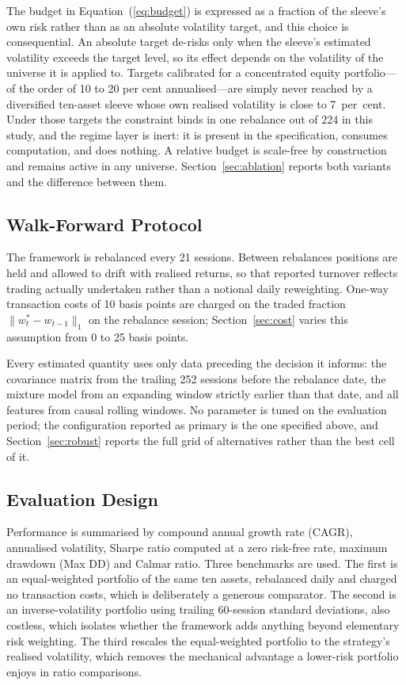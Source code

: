 \documentclass{singlecol-new}
\theoremstyle{TH}{
\newtheorem{lemma}{Lemma}
\newtheorem{theorem}[lemma]{Theorem}
\newtheorem{corrolary}[lemma]{Corrolary}
\newtheorem{conjecture}[lemma]{Conjecture}
\newtheorem{proposition}[lemma]{Proposition}
\newtheorem{claim}[lemma]{Claim}
\newtheorem{stheorem}[lemma]{Wrong Theorem}
\newtheorem{algorithm}{Algorithm}
}
\theoremstyle{THrm}{
\newtheorem{definition}{Definition}[section]
\newtheorem{question}{Question}[section]
\newtheorem{remark}{Remark}
\newtheorem{scheme}{Scheme}
}
\theoremstyle{THhit}{
\newtheorem{case}{Case}[section]
}
\begin{document}
The budget in Equation~(\ref{eq:budget}) is expressed as a fraction of the sleeve's own
risk rather than as an absolute volatility target, and this choice is consequential.
An absolute target de-risks only when the sleeve's estimated volatility exceeds the
target level, so its effect depends on the volatility of the universe it is applied to.
Targets calibrated for a concentrated equity portfolio---of the order of 10 to 20 per
cent annualised---are simply never reached by a diversified ten-asset sleeve whose own
realised volatility is close to 7~per~cent. Under those targets the constraint binds in
one rebalance out of 224 in this study, and the regime layer is inert: it is present in
the specification, consumes computation, and does nothing. A relative budget is
scale-free by construction and remains active in any universe.
Section~\ref{sec:ablation} reports both variants and the difference between them.

\subsection{Walk-Forward Protocol}

The framework is rebalanced every 21 sessions. Between rebalances positions are held
and allowed to drift with realised returns, so that reported turnover reflects trading
actually undertaken rather than a notional daily reweighting. One-way transaction costs
of 10 basis points are charged on the traded fraction $\|w^{\ast}_t - w_{t-1}\|_1$ on
the rebalance session; Section~\ref{sec:cost} varies this assumption from 0 to 25 basis
points.

Every estimated quantity uses only data preceding the decision it informs: the
covariance matrix from the trailing 252 sessions before the rebalance date, the mixture
model from an expanding window strictly earlier than that date, and all features from
causal rolling windows. No parameter is tuned on the evaluation period; the
configuration reported as primary is the one specified above, and
Section~\ref{sec:robust} reports the full grid of alternatives rather than the best
cell of it.

\subsection{Evaluation Design}

Performance is summarised by compound annual growth rate (CAGR), annualised
volatility, Sharpe ratio computed at a zero risk-free rate, maximum drawdown (Max DD)
and Calmar ratio. Three
benchmarks are used. The first is an equal-weighted portfolio of the same ten assets,
rebalanced daily and charged no transaction costs, which is deliberately a generous
comparator. The second is an inverse-volatility portfolio using trailing 60-session
standard deviations, also costless, which isolates whether the framework adds anything
beyond elementary risk weighting. The third rescales the equal-weighted portfolio to
the strategy's realised volatility, which removes the mechanical advantage a
lower-risk portfolio enjoys in ratio comparisons.
\end{document}
